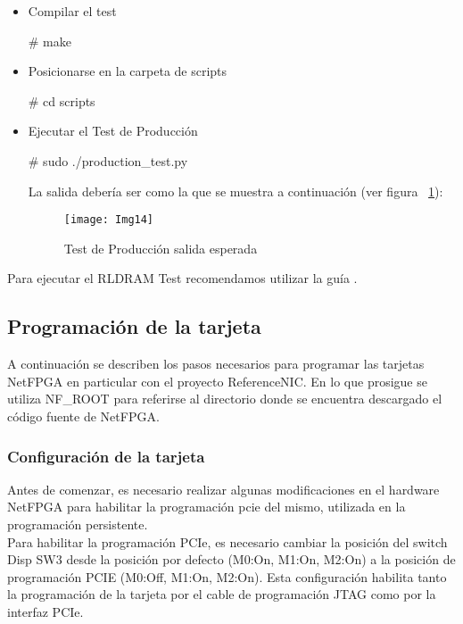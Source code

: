 \begin{itemize}
\begin{itemize}
\item Compilar el test
\begin{bash}
# make
\end{bash}

\item Posicionarse en la carpeta de scripts
\begin{bash}
# cd scripts
\end{bash}

\item Ejecutar el Test de Producción
\begin{bash}
# sudo ./production_test.py
\end{bash}

La salida debería ser como la que se muestra a continuación (ver figura ~\ref{fig:Img14}):

\newpage
\begin{figure}[htbp!] 
\centering    
\texttt{[image: Img14]}
\caption[Test de Producción salida esperada]{Test de Producción salida esperada}
\label{fig:Img14}
\end{figure}
\end{itemize}

\end{itemize}

Para ejecutar el RLDRAM Test recomendamos utilizar la guía \citep{NetFPGA8}.

\subsection{Programación de la tarjeta}

A continuación se describen los pasos necesarios para programar las tarjetas NetFPGA en particular con el proyecto ReferenceNIC. En lo que prosigue se utiliza NF\_ROOT para referirse al directorio donde se encuentra descargado el código fuente de NetFPGA.

\subsubsection{Configuración de la tarjeta}
Antes de comenzar, es necesario realizar algunas modificaciones en el hardware NetFPGA para habilitar la programación pcie del mismo, utilizada en la programación persistente.\\ 

Para habilitar la programación PCIe, es necesario cambiar la posición del switch Disp SW3 desde la posición por defecto (M0:On, M1:On, M2:On) a la posición de programación PCIE (M0:Off, M1:On, M2:On). Esta configuración habilita tanto la programación de la tarjeta por el cable de programación JTAG como por la interfaz PCIe.\\


